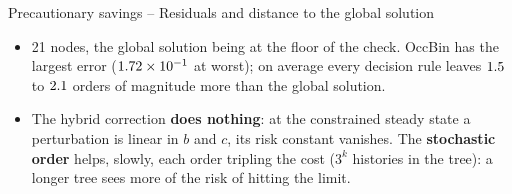 \documentclass[11pt,aspectratio=169]{beamer}
\begin{document}
\begin{frame}{Precautionary savings -- Residuals and distance to the global solution}

\begin{center}
\scriptsize
\renewcommand{\arraystretch}{0.9}

\end{center}

\begin{itemize}

\item 21 nodes, the global solution being at the floor of the check. OccBin has the largest error ($1.72\times10^{-1}$ at worst); on average every decision rule leaves $1.5$ to $2.1$ orders of magnitude more than the global solution.

\item The hybrid correction \textbf{does nothing}: at the constrained steady state a perturbation is linear in $b$ and $c$, its risk constant vanishes. The \textbf{stochastic order} helps, slowly, each order tripling the cost ($3^k$ histories in the tree): a longer tree sees more of the risk of hitting the limit.

\end{itemize}

\end{frame}
\end{document}
